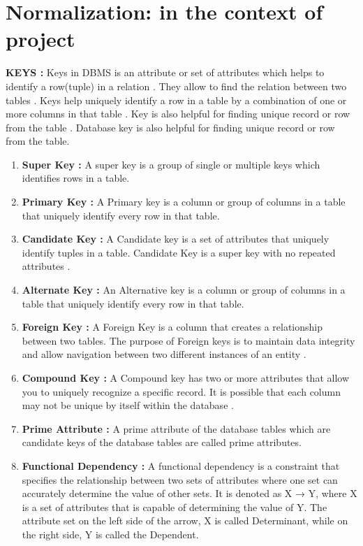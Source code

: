 \section{Normalization: in the context of project}\label{sec:ncp}
\textbf{KEYS : }
Keys in DBMS is an attribute or set of attributes which helps to identify a row(tuple) in a relation . They allow   to find the relation between two tables . Keys help   uniquely identify a row in a table by a combination of one or more columns in that table . Key is also helpful for finding unique record or row from the table . Database key is also helpful for finding unique record or row from the table.
\begin{enumerate}
 
\item
\textbf{Super Key : }A super key is a group of single or multiple keys which identifies rows in a table.\\
 
\item
\textbf{Primary Key : }A Primary key is a column or group of columns in a table that uniquely identify every row in that table.\\
 
\item
\textbf{Candidate Key : }A Candidate key is a set of attributes that uniquely identify tuples in a table. Candidate Key is a super key with no repeated attributes .\\
\item
\textbf{Alternate Key : } An Alternative key is a column or group of columns in a table that uniquely identify every row in that table.\\
\item
\textbf{Foreign Key : }A Foreign Key is a column that creates a relationship between two tables. The purpose of Foreign keys is to maintain data integrity and allow navigation between two different instances of an entity .\\
\item
\textbf{Compound Key : }A Compound key has two or more attributes that allow you to uniquely recognize a specific record. It is possible that each column may not be unique by itself within the database .\\
\item
\textbf{Prime Attribute : }A prime attribute of the database tables which are candidate keys of the database tables are called prime attributes.\\
\newpage
\item
\textbf{Functional Dependency :}
A functional dependency is a constraint that specifies the relationship between two sets of attributes where one set can accurately determine the value of other sets. It is denoted as X → Y, where X is a set of attributes that is capable of determining the value of Y. The attribute set on the left side of the arrow, X is called Determinant, while on the right side, Y is called the Dependent.

\end{enumerate}
